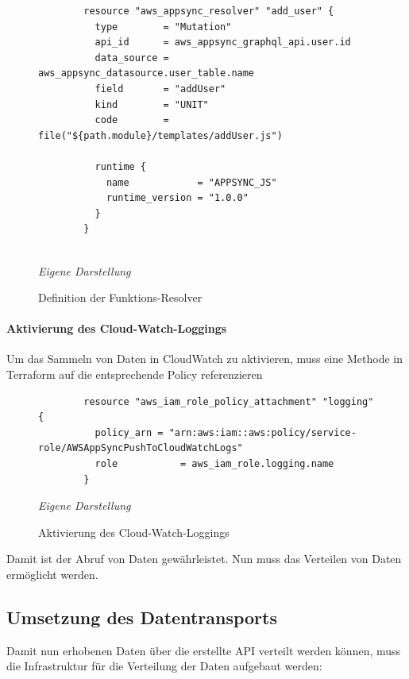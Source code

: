		\begin{figure}[H]
		\centering
		\begin{minipage}[t]{.7\textwidth} %
		\caption{Definition der Funktions-Resolver} %
		\begin{verbatim}
		resource "aws_appsync_resolver" "add_user" {
		  type        = "Mutation"
		  api_id      = aws_appsync_graphql_api.user.id
		  data_source = aws_appsync_datasource.user_table.name
		  field       = "addUser"
		  kind        = "UNIT"
		  code        = file("${path.module}/templates/addUser.js")
		
		  runtime {
		    name            = "APPSYNC_JS"
		    runtime_version = "1.0.0"
		  }
		}
		
		\end{verbatim}
		
		\textit{Eigene Darstellung} %
		\label{fig:resolverDefinition}
		\end{minipage}
		\end{figure}
	\paragraph{Aktivierung des Cloud-Watch-Loggings}
	Um das Sammeln von Daten in CloudWatch zu aktivieren, muss eine Methode in Terraform auf die entsprechende Policy referenzieren
	\newline
	\newline
		\begin{figure}[H]
		\centering
		\begin{minipage}[t]{.7\textwidth} %
		\caption{Aktivierung des Cloud-Watch-Loggings} %
		\begin{verbatim}
		resource "aws_iam_role_policy_attachment" "logging" {
		  policy_arn = "arn:aws:iam::aws:policy/service-role/AWSAppSyncPushToCloudWatchLogs"
		  role           = aws_iam_role.logging.name
		}
		\end{verbatim}
		
		\textit{Eigene Darstellung} %
		\label{fig:loggingAktivierung}
		\end{minipage}
		\end{figure}
	Damit ist der Abruf von Daten gewährleistet. Nun muss das Verteilen von Daten ermöglicht werden.

\subsection{Umsetzung des Datentransports}
	Damit nun erhobenen Daten über die erstellte API verteilt werden können, muss die Infrastruktur für die Verteilung der Daten aufgebaut werden:

